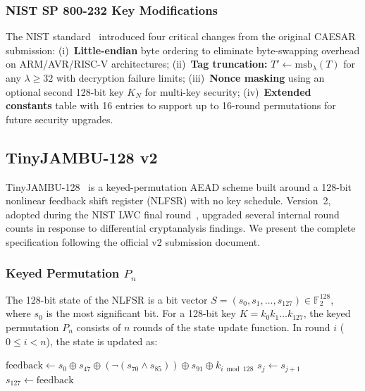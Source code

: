 \documentclass[11pt,a4paper]{article}
\newcommand{\F}{\mathbb{F}}
\newcommand{\xor}{\oplus}
\begin{document}
\subsubsection{NIST SP 800-232 Key Modifications}

The NIST standard~\cite{nist_sp800_232} introduced four critical changes from the original CAESAR submission: (i)~\textbf{Little-endian} byte ordering to eliminate byte-swapping overhead on ARM/AVR/RISC-V architectures; (ii)~\textbf{Tag truncation:} $T' \leftarrow \text{msb}_\lambda(T)$ for any $\lambda \geq 32$ with decryption failure limits; (iii)~\textbf{Nonce masking} using an optional second 128-bit key $K_N$ for multi-key security; (iv)~\textbf{Extended constants} table with 16 entries to support up to 16-round permutations for future security upgrades.

\subsection{TinyJAMBU-128 v2}

TinyJAMBU-128~\cite{tinyjambu_spec} is a keyed-permutation AEAD scheme built around a 128-bit nonlinear feedback shift register (NLFSR) with no key schedule. Version~2, adopted during the NIST LWC final round~\cite{nistir8454}, upgraded several internal round counts in response to differential cryptanalysis findings. We present the complete specification following the official v2 submission document.

\subsubsection{Keyed Permutation $P_n$}

The 128-bit state of the NLFSR is a bit vector $S = (s_0, s_1, \ldots, s_{127}) \in \F_2^{128}$, where $s_0$ is the most significant bit. For a 128-bit key $K = k_0 k_1 \ldots k_{127}$, the keyed permutation $P_n$ consists of $n$ rounds of the state update function. In round $i$ ($0 \leq i < n$), the state is updated as:

\begin{algorithm}[H]
\caption{StateUpdate$(S, K, i)$ --- One round of $P_n$}
\label{alg:tj_stateupdate}
\begin{algorithmic}[1]
\State $\text{feedback} \leftarrow s_0 \xor s_{47} \xor (\lnot(s_{70} \land s_{85})) \xor s_{91} \xor k_{i \bmod 128}$
\State $s_j \leftarrow s_{j+1}$
\EndFor
\State $s_{127} \leftarrow \text{feedback}$
\end{algorithmic}
\end{algorithm}
\end{document}

